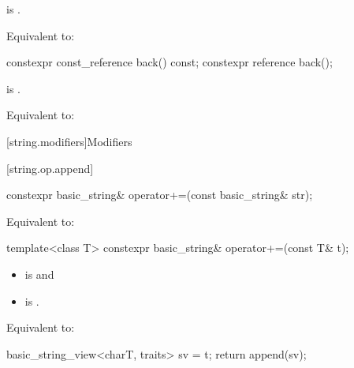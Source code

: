 \begin{itemdescr}
\pnum
\hardexpects
{} is .

\pnum
\effects
Equivalent to: 
\end{itemdescr}

%
\begin{itemdecl}
constexpr const_reference back() const;
constexpr reference back();
\end{itemdecl}

\begin{itemdescr}
\pnum
\hardexpects
{} is .

\pnum
\effects
Equivalent to: 
\end{itemdescr}

[string.modifiers]{Modifiers}

[string.op.append]{}

%
\begin{itemdecl}
constexpr basic_string& operator+=(const basic_string& str);
\end{itemdecl}

\begin{itemdescr}
\pnum
\effects
Equivalent to: 


\end{itemdescr}

%
\begin{itemdecl}
template<class T>
  constexpr basic_string& operator+=(const T& t);
\end{itemdecl}

\begin{itemdescr}
\pnum
\constraints
\begin{itemize}
\item
{} is
 and
\item
{} is
.
\end{itemize}

\pnum
\effects
Equivalent to:
\begin{codeblock}
basic_string_view<charT, traits> sv = t;
return append(sv);
\end{codeblock}
\end{itemdescr}

